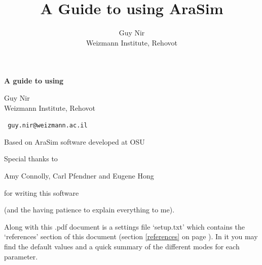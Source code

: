 \documentclass[a4paper,10pt]{article}
\newcommand{\room}{\vspace{0.3cm}}
\newcommand{\arasim}{AraSim\xspace}
\begin{document}
 



\begin{centering}

\title{A Guide to using AraSim}

\noindent\huge \textbf{A guide to using  }

\normalsize
\room

\author{Guy Nir \\ \small Weizmann Institute, Rehovot}

\Large Guy Nir \\ \small Weizmann Institute, Rehovot

\vspace{0.3cm}

\verb| guy.nir@weizmann.ac.il |

\vspace{1cm}

Based on \arasim software developed at OSU

Special thanks to 

Amy Connolly, Carl Pfendner and Eugene Hong 

for writing this software 

(and the having patience to explain everything to me). 

\end{centering}

\vspace{3cm}


Along with this .pdf document is a settings file `setup.txt' which contains the `references' section of this document (section \ref{references} on page \pageref{references}). In it you may find the default values and a quick summary of the different modes for each parameter. 




\end{document}
